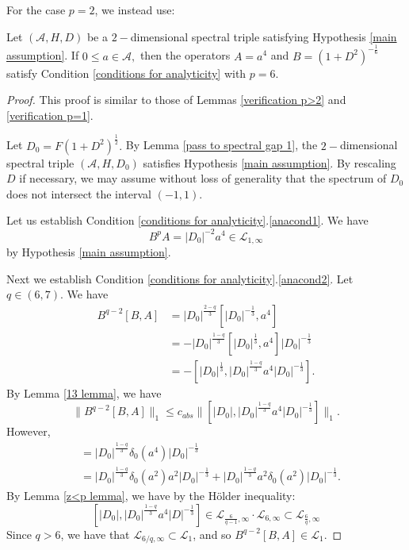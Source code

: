     For the case $p=2$, we instead use:
    \begin{lem}\label{verification p=2} 
        Let $(\mathcal{A},H,D)$ be a $2-$dimensional spectral triple satisfying Hypothesis \ref{main assumption}. If $0\leq a\in\mathcal{A},$ then the operators $A=a^4$ and $B=(1+D^2)^{-\frac16}$ satisfy Condition \ref{conditions for analyticity} with $p=6.$
    \end{lem}
    \begin{proof} 
        This proof is similar to those of Lemmas \ref{verification p>2} and \ref{verification p=1}.
    
        Let $D_0=F(1+D^2)^{\frac12}.$ By Lemma \ref{pass to spectral gap 1}, the $2-$dimensional spectral triple $(\mathcal{A},H,D_0)$ satisfies Hypothesis \ref{main assumption}. By rescaling $D$ if necessary,
        we may assume without loss of generality that the spectrum of $D_0$ does not intersect the interval $(-1,1)$.

        Let us establish Condition \ref{conditions for analyticity}.\eqref{anacond1}. We have
        $$B^pA=|D_0|^{-2}a^4\in\mathcal{L}_{1,\infty}$$
        by Hypothesis \ref{main assumption}.

        Next we establish Condition \ref{conditions for analyticity}.\eqref{anacond2}. Let $q\in(6,7).$ We have
        \begin{align*}
            B^{q-2}[B,A] &= |D_0|^{\frac{2-q}{3}}[|D_0|^{-\frac13},a^4]\\
                         &= -|D_0|^{\frac{1-q}{3}}[|D_0|^{\frac13},a^4]|D_0|^{-\frac13}\\
                         &= -[|D_0|^{\frac13},|D_0|^{\frac{1-q}3}a^4|D_0|^{-\frac13}].
        \end{align*}
        By Lemma \ref{13 lemma}, we have
        $$\|B^{q-2}[B,A]\|_1\leq c_{abs}\|[|D_0|,|D_0|^{\frac{1-q}3}a^4|D_0|^{-\frac13}]\|_1.$$
        However,
        \begin{align*}
            [|D_0|,|D_0|^{\frac{1-q}3}a^4|D_0|^{-\frac13}] &= |D_0|^{\frac{1-q}3}\delta_0(a^4)|D_0|^{-\frac13}\\
                                                           &= |D_0|^{\frac{1-q}3}\delta_0(a^2)a^2|D_0|^{-\frac13}+|D_0|^{\frac{1-q}3}a^2\delta_0(a^2)|D_0|^{-\frac13}.
        \end{align*}
        By Lemma \ref{z<p lemma}, we have by the H\"older inequality:
        $$[|D_0|,|D_0|^{\frac{1-q}3}a^4|D|^{-\frac13}]\in\mathcal{L}_{\frac{6}{q-1},\infty}\cdot\mathcal{L}_{6,\infty}\subset\mathcal{L}_{\frac{6}{q},\infty}$$
        Since $q > 6$, we have that $\mathcal{L}_{6/q,\infty} \subset \mathcal{L}_1$, and so $B^{q-2}[B,A] \in \mathcal{L}_1$.


\end{proof}
